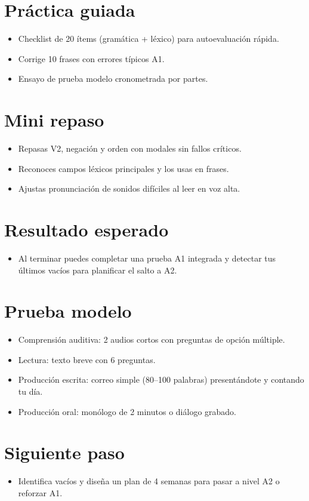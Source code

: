 \section{Práctica guiada}
\begin{itemize}[leftmargin=*]
	\item Checklist de 20 ítems (gramática + léxico) para autoevaluación rápida.
	\item Corrige 10 frases con errores típicos A1.
	\item Ensayo de prueba modelo cronometrada por partes.
\end{itemize}

\section{Mini repaso}
\begin{itemize}[leftmargin=*]
	\item Repasas V2, negación y orden con modales sin fallos críticos.
	\item Reconoces campos léxicos principales y los usas en frases.
	\item Ajustas pronunciación de sonidos difíciles al leer en voz alta.
\end{itemize}

\section{Resultado esperado}
\begin{itemize}[leftmargin=*]
	\item Al terminar puedes completar una prueba A1 integrada y detectar tus últimos vacíos para planificar el salto a A2.
\end{itemize}

\section{Prueba modelo}
\begin{itemize}[leftmargin=*]
	\item Comprensión auditiva: 2 audios cortos con preguntas de opción múltiple.
	\item Lectura: texto breve con 6 preguntas.
	\item Producción escrita: correo simple (80--100 palabras) presentándote y contando tu día.
	\item Producción oral: monólogo de 2 minutos o diálogo grabado.
\end{itemize}

\section{Siguiente paso}
\begin{itemize}[leftmargin=*]
	\item Identifica vacíos y diseña un plan de 4 semanas para pasar a nivel A2 o reforzar A1.
\end{itemize}
